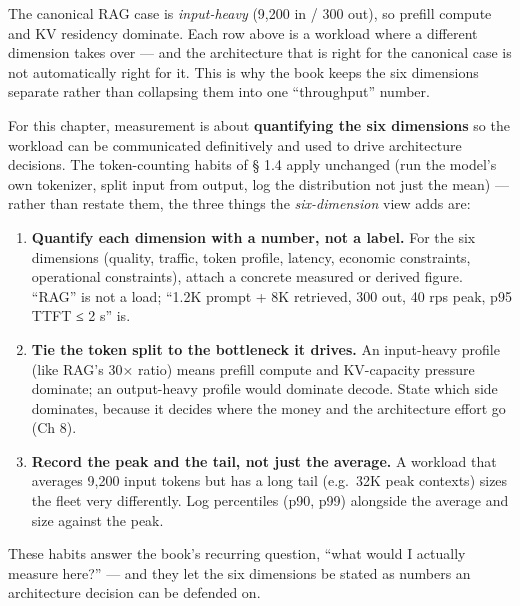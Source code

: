 The canonical RAG case is \emph{input-heavy} (9,200 in / 300 out), so
prefill compute and KV residency dominate. Each row above is a workload
where a different dimension takes over --- and the architecture that is
right for the canonical case is not automatically right for it. This is
why the book keeps the six dimensions separate rather than collapsing
them into one ``throughput'' number.

\label{measurement}


For this chapter, measurement is about \textbf{quantifying the six
dimensions} so the workload can be communicated definitively and used to
drive architecture decisions. The token-counting habits of § 1.4 apply
unchanged (run the model's own tokenizer, split input from output, log
the distribution not just the mean) --- rather than restate them, the
three things the \emph{six-dimension} view adds are:

\begin{enumerate}
\def\labelenumi{\arabic{enumi}.}
\tightlist
\item
  \textbf{Quantify each dimension with a number, not a label.} For the
  six dimensions (quality, traffic, token profile, latency, economic
  constraints, operational constraints), attach a concrete measured or
  derived figure. ``RAG'' is not a load; ``1.2K prompt + 8K retrieved,
  300 out, 40 rps peak, p95 TTFT ≤ 2 s'' is.
\item
  \textbf{Tie the token split to the bottleneck it drives.} An
  input-heavy profile (like RAG's 30× ratio) means prefill compute and
  KV-capacity pressure dominate; an output-heavy profile would dominate
  decode. State which side dominates, because it decides where the money
  and the architecture effort go (Ch 8).
\item
  \textbf{Record the peak and the tail, not just the average.} A
  workload that averages 9,200 input tokens but has a long tail
  (e.g.~32K peak contexts) sizes the fleet very differently. Log
  percentiles (p90, p99) alongside the average and size against the
  peak.
\end{enumerate}

These habits answer the book's recurring question, ``what would I
actually measure here?'' --- and they let the six dimensions be stated
as numbers an architecture decision can be defended on.

\label{common-mistakes}


